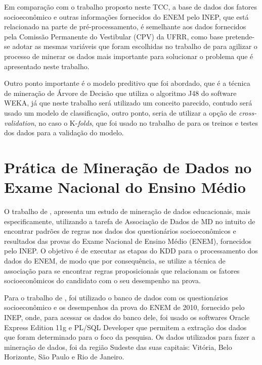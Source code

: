 \par
Em comparação com o trabalho proposto neste TCC,  a base de dados dos fatores socioeconômico e outras informações fornecidos do ENEM pelo INEP, que está relacionado na parte de pré-processamento, é semelhante aos dados fornecidos pela Comissão Permanente do Vestibular (CPV) da UFRR, como base pretende-se adotar as mesmas variáveis que foram escolhidas no trabalho de  para agilizar o processo de minerar os dados mais importante para solucionar o problema que é apresentado neste trabalho.

\par
Outro ponto importante é o modelo preditivo que foi abordado, que é a técnica de mineração de Árvore de Decisão que utiliza o algoritmo J48 do software WEKA, já que neste trabalho será utilizado um conceito parecido, contudo será usado um modelo de classificação, outro ponto, seria de utilizar a opção de \textit{cross-validation}, no caso o K-\textit{folds}, que foi usado no trabalho de  para os treinos e testes dos dados para a validação do modelo.



\section{Prática de Mineração de Dados no Exame Nacional do Ensino Médio}

\par
O trabalho de , apresenta um estudo de mineração de dados educacionais, mais especificamente, utilizando a tarefa de Associação de Dados de MD no intuito de encontrar padrões de regras nos dados dos questionários socioeconômicos e resultados das provas do Exame Nacional de Ensino Médio (ENEM), fornecidos pelo INEP. O objetivo é de executar as etapas do KDD para o processamento dos dados do ENEM, de modo que por consequência, se utilize a técnica de associação para se encontrar regras proposicionais que relacionam os fatores socioeconômicos do candidato com o seu desempenho na prova.

\par
Para o trabalho de , foi utilizado o banco de dados com os questionários socioeconômico e os desempenhos da prova do ENEM de 2010, fornecido pelo INEP, onde, para acessar os dados do banco dele, foi usado os softwares Oracle Express Edition 11g e PL/SQL Developer que permitem a extração dos dados que foram determinado para o foco da pesquisa. Os dados utilizados para fazer a mineração de dados, foi da região Sudeste das suas capitais: Vitória, Belo Horizonte, São Paulo e Rio de Janeiro.

